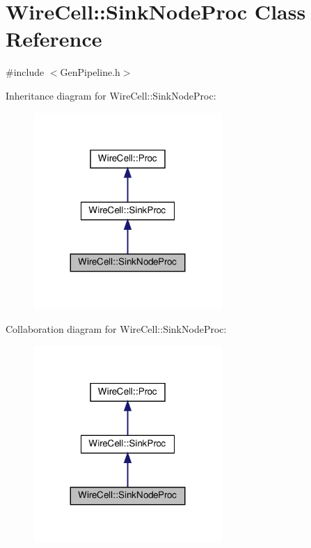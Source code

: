 \hypertarget{class_wire_cell_1_1_sink_node_proc}{}\section{Wire\+Cell\+:\+:Sink\+Node\+Proc Class Reference}
\label{class_wire_cell_1_1_sink_node_proc}


{\ttfamily \#include $<$Gen\+Pipeline.\+h$>$}



Inheritance diagram for Wire\+Cell\+:\+:Sink\+Node\+Proc\+:
\nopagebreak
\begin{figure}[H]
\begin{center}
\leavevmode
\includegraphics[width=203pt]{class_wire_cell_1_1_sink_node_proc__inherit__graph}
\end{center}
\end{figure}


Collaboration diagram for Wire\+Cell\+:\+:Sink\+Node\+Proc\+:
\nopagebreak
\begin{figure}[H]
\begin{center}
\leavevmode
\includegraphics[width=203pt]{class_wire_cell_1_1_sink_node_proc__coll__graph}
\end{center}
\end{figure}
